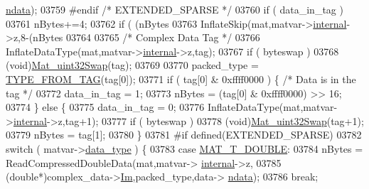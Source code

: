 \begin{DoxyCode}
{{{{{{{{{{{{{{{{{{      \hyperlink{group___m_a_t_a1beb8a8c58a808207cbea650563a9b63}{ndata});
03759 \textcolor{preprocessor}{#endif    }\textcolor{comment}{/* EXTENDED\_SPARSE */}\textcolor{preprocessor}{}
03760                     \textcolor{keywordflow}{if} ( data\_in\_tag )
03761                         nBytes+=4;
03762                     \textcolor{keywordflow}{if} ( (nBytes %
03763                         InflateSkip(mat,matvar->\hyperlink{group___m_a_t_a6e97e3ed9f40c49322c18561c2a94e92}{internal}->z,8-(nBytes %
03764 
03765                     \textcolor{comment}{/* Complex Data Tag */}
03766                     InflateDataType(mat,matvar->\hyperlink{group___m_a_t_a6e97e3ed9f40c49322c18561c2a94e92}{internal}->z,tag);
03767                     \textcolor{keywordflow}{if} ( byteswap )
03768                         (void)\hyperlink{endian_8c_a8cb0d0750e2eaf9840d95db531934f4f}{Mat\_uint32Swap}(tag);
03769 
03770                     packed\_type = \hyperlink{mat5_8c_a82bacecc4afc633b61bc3dc8ef88d1ed}{TYPE\_FROM\_TAG}(tag[0]);
03771                     \textcolor{keywordflow}{if} ( tag[0] & 0xffff0000 ) \{ \textcolor{comment}{/* Data is in the tag */}
03772                         data\_in\_tag = 1;
03773                         nBytes = (tag[0] & 0xffff0000) >> 16;
03774                     \} \textcolor{keywordflow}{else} \{
03775                         data\_in\_tag = 0;
03776                         InflateDataType(mat,matvar->\hyperlink{group___m_a_t_a6e97e3ed9f40c49322c18561c2a94e92}{internal}->z,tag+1);
03777                         \textcolor{keywordflow}{if} ( byteswap )
03778                             (void)\hyperlink{endian_8c_a8cb0d0750e2eaf9840d95db531934f4f}{Mat\_uint32Swap}(tag+1);
03779                         nBytes = tag[1];
03780                     \}
03781 \textcolor{preprocessor}{#if defined(EXTENDED\_SPARSE)}
03782                     \textcolor{keywordflow}{switch} ( matvar->\hyperlink{group___m_a_t_ab6aafe9bd77f0f077852593dec438144}{data\_type} ) \{
03783                         \textcolor{keywordflow}{case} \hyperlink{group___m_a_t_ggacf7b3b879282b7ab3a51190e49bf3453a31e721ecf7e188196f83c32838288797}{MAT\_T\_DOUBLE}:
03784                             nBytes = ReadCompressedDoubleData(mat,matvar->
      \hyperlink{group___m_a_t_a6e97e3ed9f40c49322c18561c2a94e92}{internal}->z,
03785                                  (\textcolor{keywordtype}{double}*)complex\_data->\hyperlink{group___m_a_t_a7182d10b0d3598415887376065440946}{Im},packed\_type,data->
      \hyperlink{group___m_a_t_a1beb8a8c58a808207cbea650563a9b63}{ndata});
03786                             \textcolor{keywordflow}{break};
}}}}}}}}}}}}}}}}}}
\end{DoxyCode}
